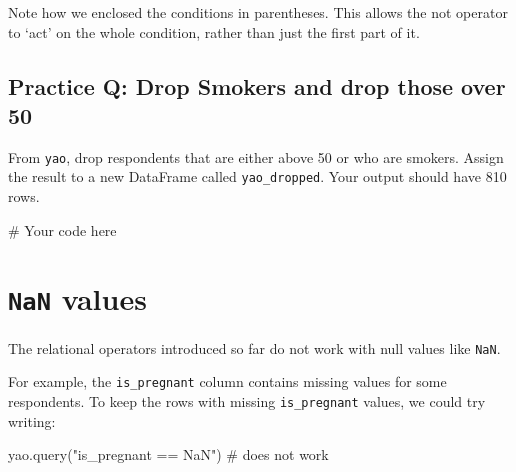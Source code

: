 \documentclass[
  letterpaper,
  DIV=11,
  numbers=noendperiod]{scrreprt}
\newenvironment{Shaded}{\begin{snugshade}}{\end{snugshade}}
\newcommand{\CommentTok}[1]{\textcolor[rgb]{0.37,0.37,0.37}{#1}}
\newcommand{\NormalTok}[1]{\textcolor[rgb]{0.00,0.23,0.31}{#1}}
\newcommand{\StringTok}[1]{\textcolor[rgb]{0.13,0.47,0.30}{#1}}
\begin{document}
Note how we enclosed the conditions in parentheses. This allows the not
operator to `act' on the whole condition, rather than just the first
part of it.

\begin{tcolorbox}[enhanced jigsaw, colframe=quarto-callout-tip-color-frame, opacityback=0, titlerule=0mm, bottomrule=.15mm, breakable, leftrule=.75mm, colbacktitle=quarto-callout-tip-color!10!white, title=\textcolor{quarto-callout-tip-color}{\faLightbulb}\hspace{0.5em}{Practice}, rightrule=.15mm, coltitle=black, opacitybacktitle=0.6, colback=white, left=2mm, arc=.35mm, toptitle=1mm, bottomtitle=1mm, toprule=.15mm]

\subsection{Practice Q: Drop Smokers and drop those over
50}\label{practice-q-drop-smokers-and-drop-those-over-50}

From \texttt{yao}, drop respondents that are either above 50 or who are
smokers. Assign the result to a new DataFrame called
\texttt{yao\_dropped}. Your output should have 810 rows.

\begin{Shaded}
\begin{Highlighting}[]
\CommentTok{\# Your code here}
\end{Highlighting}
\end{Shaded}

\end{tcolorbox}

\section{\texorpdfstring{\texttt{NaN}
values}{NaN values}}\label{nan-values}

The relational operators introduced so far do not work with null values
like \texttt{NaN}.

For example, the \texttt{is\_pregnant} column contains missing values
for some respondents. To keep the rows with missing
\texttt{is\_pregnant} values, we could try writing:

\begin{Shaded}
\begin{Highlighting}[]
\NormalTok{yao.query(}\StringTok{"is\_pregnant == NaN"}\NormalTok{)  }\CommentTok{\# does not work}
\end{Highlighting}
\end{Shaded}
\end{document}
